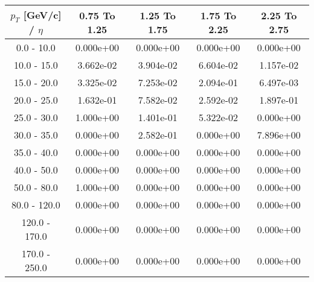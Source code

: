 \begin{tabular}{|c|c|c|c|c|}\hline 
$p_T$ [GeV/c] / $\eta$  & 0.75 To 1.25 & 1.25 To 1.75 & 1.75 To 2.25 & 2.25 To 2.75 \\ 
 \hline 
0.0 - 10.0 & 0.000e+00 & 0.000e+00 & 0.000e+00 & 0.000e+00 \\ 
10.0 - 15.0 & 3.662e-02 & 3.904e-02 & 6.604e-02 & 1.157e-02 \\ 
15.0 - 20.0 & 3.325e-02 & 7.253e-02 & 2.094e-01 & 6.497e-03 \\ 
20.0 - 25.0 & 1.632e-01 & 7.582e-02 & 2.592e-02 & 1.897e-01 \\ 
25.0 - 30.0 & 1.000e+00 & 1.401e-01 & 5.322e-02 & 0.000e+00 \\ 
30.0 - 35.0 & 0.000e+00 & 2.582e-01 & 0.000e+00 & 7.896e+00 \\ 
35.0 - 40.0 & 0.000e+00 & 0.000e+00 & 0.000e+00 & 0.000e+00 \\ 
40.0 - 50.0 & 0.000e+00 & 0.000e+00 & 0.000e+00 & 0.000e+00 \\ 
50.0 - 80.0 & 1.000e+00 & 0.000e+00 & 0.000e+00 & 0.000e+00 \\ 
80.0 - 120.0 & 0.000e+00 & 0.000e+00 & 0.000e+00 & 0.000e+00 \\ 
120.0 - 170.0 & 0.000e+00 & 0.000e+00 & 0.000e+00 & 0.000e+00 \\ 
170.0 - 250.0 & 0.000e+00 & 0.000e+00 & 0.000e+00 & 0.000e+00 \\ 
 \hline 
\end{tabular} 
